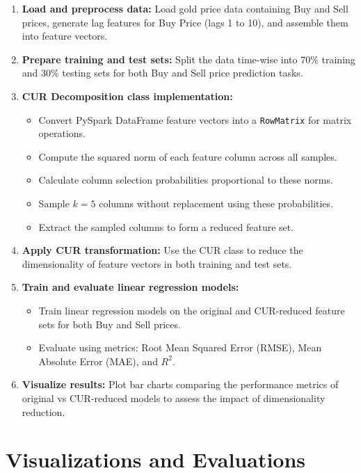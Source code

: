\documentclass[a4paper,12pt]{article}
\begin{document}
\begin{enumerate}
    \item \textbf{Load and preprocess data:} Load gold price data containing Buy and Sell prices, generate lag features for Buy Price (lags 1 to 10), and assemble them into feature vectors.
    
    \item \textbf{Prepare training and test sets:} Split the data time-wise into 70\% training and 30\% testing sets for both Buy and Sell price prediction tasks.
    
    \item \textbf{CUR Decomposition class implementation:}
    \begin{itemize}
        \item Convert PySpark DataFrame feature vectors into a \texttt{RowMatrix} for matrix operations.
        \item Compute the squared norm of each feature column across all samples.
        \item Calculate column selection probabilities proportional to these norms.
        \item Sample \( k=5 \) columns without replacement using these probabilities.
        \item Extract the sampled columns to form a reduced feature set.
    \end{itemize}
    
    \item \textbf{Apply CUR transformation:} Use the CUR class to reduce the dimensionality of feature vectors in both training and test sets.
    
    \item \textbf{Train and evaluate linear regression models:} 
    \begin{itemize}
        \item Train linear regression models on the original and CUR-reduced feature sets for both Buy and Sell prices.
        \item Evaluate using metrics: Root Mean Squared Error (RMSE), Mean Absolute Error (MAE), and \( R^2 \).
    \end{itemize}
    
    \item \textbf{Visualize results:} Plot bar charts comparing the performance metrics of original vs CUR-reduced models to assess the impact of dimensionality reduction.
\end{enumerate}

\section{Visualizations and Evaluations}
\end{document}
